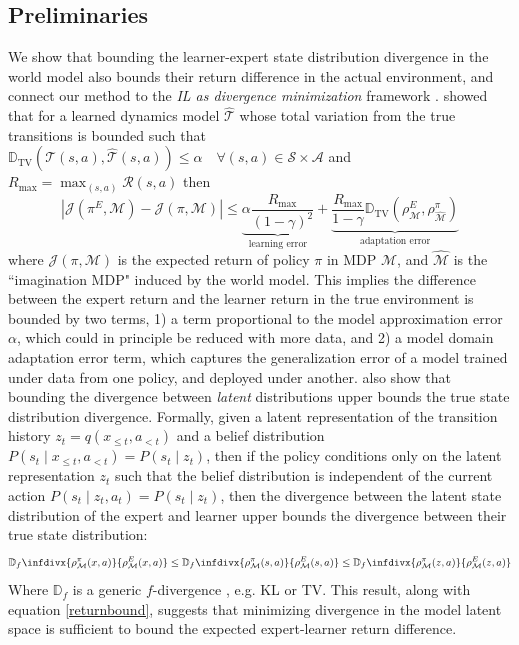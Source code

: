 \documentclass[10pt]{article} %
\newcommand{\divf}{\mathbb{D}_{f}\infdivx}
\theoremstyle{plain}
\theoremstyle{definition}
\theoremstyle{remark}
\begin{document}
\subsection{Preliminaries}
We show that bounding the learner-expert state distribution divergence in the world model also bounds their return difference in the actual environment, and connect our method to the \emph{IL as divergence minimization} framework \citep{divmin}. \citet{vmail} showed that for a learned dynamics model $\widehat{\mathcal{T}}$ whose total variation from the true transitions is bounded such that 
$\mathbb{D}_{\text{TV}}(\mathcal{T}(s,a), \widehat{\mathcal{T}}(s,a)) \leq \alpha \quad \forall (s,a) \in \mathcal{S}\times\mathcal{A}$ and $R_{\text{max}} = \max_{(s,a)}\mathcal{R}(s,a)$ then
\begin{equation}\label{returnbound}
    \left| \mathcal{J}(\pi^E, \mathcal{M}) - \mathcal{J}(\pi, \mathcal{M}) \right| \leq 
    \underbrace{\alpha \frac{R_{\text{max}}}{(1-\gamma)^2}}_{\text{learning error}} +
    \underbrace{\frac{R_{\text{max}}}{1-\gamma} \mathbb{D}_{\text{TV}}\left( \rho^E_\mathcal{M}, \rho^\pi_{\widehat{\mathcal{M}}}\right)}_{\text{adaptation error}}
\end{equation}
where $\mathcal{J}(\pi,\mathcal{M})$ is the expected return of policy $\pi$ in MDP $\mathcal{M}$, and $\mathcal{\widehat{M}}$ is the ``imagination MDP" induced by the world model. This implies the difference between the expert return and the learner return in the true environment is bounded by two terms, 1) a term proportional to the model approximation error $\alpha$, which could in principle be reduced with more data, and 2) a model domain adaptation error term, which captures the generalization error of a model trained under data from one policy, and deployed under another. \citet{vmail} also show that bounding the divergence between \emph{latent} distributions upper bounds the true state distribution divergence. Formally, given a latent representation of the transition history $z_t = q(x_{\leq t}, a_{<t})$ and a belief distribution $P(s_t \mid x_{\leq t}, a_{<t}) = P(s_t \mid z_t)$, then if the policy conditions only on the latent representation $z_t$ such that the belief distribution is independent of the current action $P(s_t \mid z_t, a_t) = P(s_t \mid z_t)$, then the divergence between the latent state distribution of the expert and learner upper bounds the divergence between their true state distribution:
\begin{equation}\label{latentbounds}
    \divf{\rho^{\pi}_{\mathcal{M}}(x,a)}{\rho^{E}_{\mathcal{M}}(x,a)} \leq \divf{\rho^{\pi}_{\mathcal{M}}(s,a)}{\rho^{E}_{\mathcal{M}}(s,a)} \leq \divf{\rho^{\pi}_{\mathcal{M}}(z,a)}{\rho^{E}_{\mathcal{M}}(z,a)}
\end{equation}
Where $\mathbb{D}_{f}$ is a generic $f$-divergence , e.g. KL or TV. This result, along with equation \ref{returnbound}, suggests that minimizing divergence in the model latent space is sufficient to bound the expected expert-learner return difference.
\end{document}
